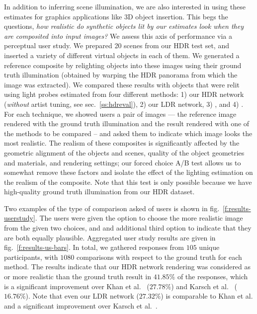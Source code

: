 In addition to inferring scene illumination, we are also interested in using these estimates for graphics applications like 3D object insertion. This begs the questions, \emph{how realistic do synthetic objects lit by our estimates look when they are composited into input images?} We assess this axis of performance via a perceptual user study. We prepared 20 scenes from our HDR test set, and inserted a variety of different virtual objects in each of them. We generated a reference composite by relighting objects into these images using their ground truth illumination (obtained by warping the HDR panorama from which the image was extracted). We compared these results with objects that were relit using light probes estimated from four different methods: 1) our HDR network (\emph{without} artist tuning, see sec.~\ref{ss:hdreval}), 2) our LDR network, 3) \cite{khan-siggraph-06}, and 4) \cite{karsch-tog-14}. For each technique, we showed users a pair of images --- the reference image rendered with the ground truth illumination and the result rendered with one of the methods to be compared -- and asked them to indicate which image looks the most realistic. The realism of these composites is significantly affected by the geometric alignment of the objects and scenes, quality of the object geometries and materials, and rendering settings; our forced choice A/B test allows us to somewhat remove these factors and isolate the effect of the lighting estimation on the realism of the composite. Note that this test is only possible because we have high-quality ground truth illumination from our HDR dataset.

Two examples of the type of comparison asked of users is shown in fig.~\ref{f:results-userstudy}. The users were given the option to choose the more realistic image from the given two choices, and and additional third option to indicate that they are both equally plausible. Aggregated user study results are given in fig.~\ref{f:results-us-bars}. In total, we gathered responses from $105$ unique participants, with $1080$ comparisons with respect to the ground truth for each method. The results indicate that our HDR network rendering was considered as or more realistic than the ground truth result in $41.85\%$ of the responses, which is a significant improvement over Khan et al.~ ($27.78\%$) and Karsch et al.~ ($16.76\%$). Note that even our LDR network ($27.32\%$) is comparable to Khan et al. and a significant improvement over Karsch et al.~.

